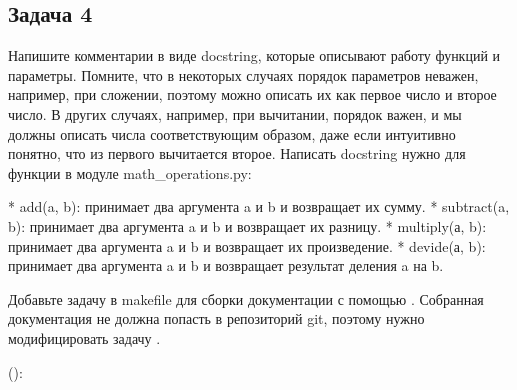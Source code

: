 \documentclass[letterpaper,10pt,russian]{sphinxmanual}
\begin{document}
\subsection{Задача 4}
\label{\detokenize{educational_materials/code_to_lib/exercises:id5}}
\sphinxAtStartPar
Напишите комментарии в виде docstring, которые описывают работу функций и параметры. Помните, что в некоторых случаях порядок параметров неважен, например, при сложении, поэтому можно описать их как первое число и второе число. В других случаях, например, при вычитании, порядок важен, и мы должны описать числа соответствующим образом, даже если интуитивно понятно, что из первого вычитается второе. Написать docstring нужно для функции в модуле math\_operations.py:

\begin{sphinxVerbatim}[commandchars=\\\{\}]
* add(a, b): принимает два аргумента a и b и возвращает их сумму.
* subtract(a, b): принимает два аргумента a и b и возвращает их разницу.
* multiply(а, b): принимает два аргумента a и b и возвращает их произведение.
* devide(а, b): принимает два аргумента a и b и возвращает результат деления a на b.
\end{sphinxVerbatim}

\sphinxAtStartPar
Добавьте задачу  в makefile  для сборки документации с помощью . Собранная документация не должна попасть в репозиторий git, поэтому нужно модифицировать задачу .

\sphinxAtStartPar
{}

\sphinxAtStartPar
():
\end{document}
